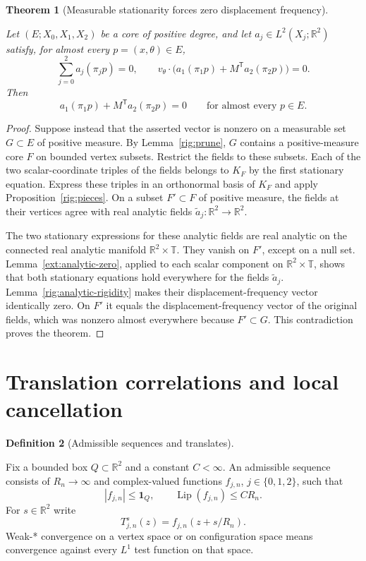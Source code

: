 \documentclass[11pt]{amsart}
\newcommand{\R}{\mathbb R}
\newcommand{\one}{\mathbf 1}
\newtheorem{theorem}{Theorem}[section]
\theoremstyle{definition}
\newtheorem{definition}[theorem]{Definition}
\theoremstyle{remark}
\numberwithin{equation}{section}
\providecommand{\lean}[1]{}
\providecommand{\leanok}{}
\begin{document}
\begin{theorem}[Measurable stationarity forces zero displacement frequency]
\label{rig:exact}
\lean{Auto.rig_exact}
\leanok
Let $(E;X_0,X_1,X_2)$ be a core of positive degree, and let
$a_j\in L^2(X_j;\R^2)$ satisfy, for almost every $p=(x,\theta)\in E$,
\[
 \sum_{j=0}^2a_j(\pi_jp)=0,
 \qquad
 v_\theta\cdot
 \bigl(a_1(\pi_1p)+M^{\mathsf T}a_2(\pi_2p)\bigr)=0.
\]
Then
\[
 a_1(\pi_1p)+M^{\mathsf T}a_2(\pi_2p)=0
 \qquad\text{for almost every }p\in E.
\]
\end{theorem}
\begin{proof}
Suppose instead that the asserted vector is nonzero on a measurable
set $G\subset E$ of positive measure. By Lemma~\ref{rig:prune}, $G$
contains a positive-measure core $F$ on bounded vertex subsets.
Restrict the fields to these subsets. Each of the two scalar-coordinate
triples of the fields belongs to $K_F$ by the first stationary equation.
Express these triples in an orthonormal basis of $K_F$ and apply
Proposition~\ref{rig:pieces}. On a subset $F'\subset F$ of positive
measure, the fields at their vertices agree with real analytic fields
$\widetilde a_j:\R^2\to\R^2$.

The two stationary expressions for these analytic fields are real
analytic on the connected real analytic manifold $\R^2\times \mathbb T$.
They vanish on $F'$, except on a null set.
Lemma~\ref{ext:analytic-zero}, applied to each scalar component on
$\R^2\times\mathbb T$, shows that both stationary equations hold
everywhere for the fields $\widetilde a_j$.
Lemma~\ref{rig:analytic-rigidity} makes their displacement-frequency
vector identically zero. On $F'$ it equals the displacement-frequency
vector of the original fields, which was nonzero almost everywhere
because $F'\subset G$. This contradiction proves the theorem.
\end{proof}


\section{Translation correlations and local cancellation}

\begin{definition}[Admissible sequences and translates]\label{ann:sequence}
\lean{Auto.IsAdmissibleSeq,Auto.annT,Auto.annWeakStar}
Fix a bounded box $Q\subset\R^2$ and a constant $C<\infty$.
An admissible sequence consists of $R_n\to\infty$ and complex-valued
functions $f_{j,n}$, $j\in\{0,1,2\}$, such that
\[
 |f_{j,n}|\le\one_Q,\qquad \operatorname{Lip}(f_{j,n})\le CR_n.
\]
For $s\in\R^2$ write
\[
 T^s_{j,n}(z)=f_{j,n}(z+s/R_n).
\]
Weak-* convergence on a vertex space or on configuration space means
convergence against every $L^1$ test function on that space.
\end{definition}
\end{document}
